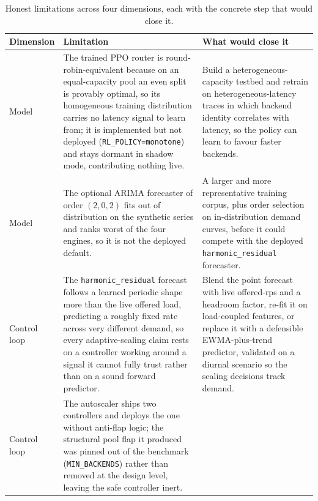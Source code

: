 \begin{table}[H]
  \centering
  \caption[Honest limitations and their closing steps]{Honest limitations across four dimensions, each with the concrete step that would close it.}
  \label{tab:conc:limitations}
  \small
  \begin{tabularx}{\linewidth}{@{}p{2.0cm} Y Y@{}}
    \toprule
    \headrow
    \textbf{Dimension} & \textbf{Limitation} & \textbf{What would close it} \\
    \midrule
    Model
      & The trained PPO router is round-robin-equivalent because on an equal-capacity pool
        an even split is provably optimal, so its homogeneous training distribution carries
        no latency signal to learn from; it is implemented but not deployed
        (\texttt{RL\_POLICY=monotone}) and stays dormant in shadow mode, contributing
        nothing live.
      & Build a heterogeneous-capacity testbed and retrain on heterogeneous-latency traces
        in which backend identity correlates with latency, so the policy can learn to
        favour faster backends. \\
    \addlinespace
    Model
      & The optional ARIMA forecaster of order $(2,0,2)$ fits out of distribution on the
        synthetic series and ranks worst of the four engines, so it is not the deployed
        default.
      & A larger and more representative training corpus, plus order selection on
        in-distribution demand curves, before it could compete with the deployed
        \texttt{harmonic\_residual} forecaster. \\
    \addlinespace
    Control loop
      & The \texttt{harmonic\_residual} forecast follows a learned periodic shape more than
        the live offered load, predicting a roughly fixed rate across very different demand,
        so every adaptive-scaling claim rests on a controller working around a signal it
        cannot fully trust rather than on a sound forward predictor.
      & Blend the point forecast with live offered-rps and a headroom factor, re-fit it on
        load-coupled features, or replace it with a defensible EWMA-plus-trend predictor,
        validated on a diurnal scenario so the scaling decisions track demand. \\
    \addlinespace
    Control loop
      & The autoscaler ships two controllers and deploys the one without anti-flap logic;
        the structural pool flap it produced was pinned out of the benchmark
        (\texttt{MIN\_BACKENDS}) rather than removed at the design level, leaving the safe
        controller inert.

\end{tabularx}
\end{table}
